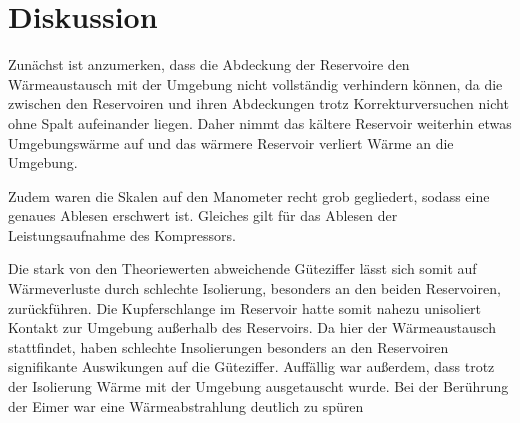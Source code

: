 \section{Diskussion}
\label{sec:Diskussion}

Zunächst ist anzumerken, dass die Abdeckung der Reservoire den Wärmeaustausch mit der Umgebung nicht vollständig verhindern können, da die zwischen den Reservoiren und ihren Abdeckungen trotz Korrekturversuchen nicht ohne Spalt aufeinander liegen.
Daher nimmt das kältere Reservoir weiterhin etwas Umgebungswärme auf und das wärmere Reservoir verliert Wärme an die Umgebung.

Zudem waren die Skalen auf den Manometer recht grob gegliedert, sodass eine genaues Ablesen erschwert ist. Gleiches gilt für das Ablesen der Leistungsaufnahme des Kompressors.

Die stark von den Theoriewerten abweichende Güteziffer lässt sich somit auf Wärmeverluste durch schlechte Isolierung, besonders an den beiden Reservoiren, zurückführen.
Die Kupferschlange im Reservoir hatte somit nahezu unisoliert Kontakt zur Umgebung außerhalb des Reservoirs. Da hier der Wärmeaustausch stattfindet, haben schlechte Insolierungen besonders an den Reservoiren signifikante Auswikungen auf die Güteziffer.
Auffällig war außerdem, dass trotz der Isolierung Wärme mit der Umgebung ausgetauscht wurde. Bei der Berührung der Eimer war eine Wärmeabstrahlung deutlich zu spüren

\newpage

